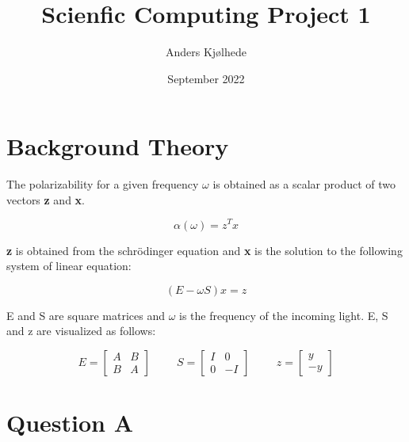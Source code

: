 \documentclass[a4paper,12pkt]{report}
\title{Scienfic Computing Project 1 }
\author{Anders Kjølhede}
\date{September 2022}
\begin{document}
\pagestyle{fancy}
\fancyhf{}

\maketitle

\onehalfspacing %
\setlength{\jot}{10pt} %

\section*{Background Theory}

The polarizability for a given frequency $\omega$ is obtained as a scalar product of two vectors \textbf{z} and \textbf{x}.

\begin{equation}
    \alpha(\omega) = z^Tx
\end{equation}

\textbf{z} is obtained from the schrödinger equation and \textbf{x} is the solution to the following system of linear equation:

\begin{equation}
    (E-\omega S)x = z
\end{equation}

E and S are square matrices and $\omega$ is the frequency of the incoming light. E, S and z are visualized as follows:

\begin{equation}
    E = \begin{bmatrix}
        A & B \\
        B & A
    \end{bmatrix}
    \hspace{1cm}
    S = \begin{bmatrix}
        I & 0 \\
        0 & -I
    \end{bmatrix}
    \hspace{1cm}
    z = \begin{bmatrix}
        y \\
        -y
    \end{bmatrix}
\end{equation}

\section*{Question A}
\end{document}
